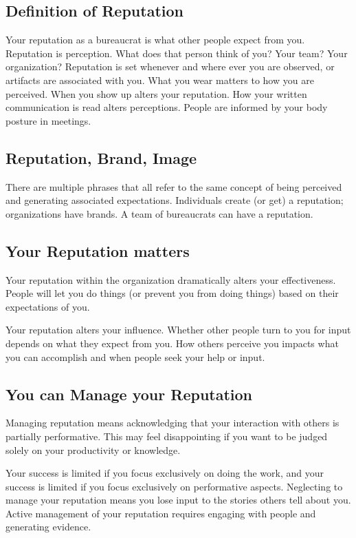 \subsection*{Definition of Reputation}

Your \gls{reputation} as a bureaucrat is what other people expect from you. \iftoggle{glossaryinmargin}{\marginpar{[Glossary]}}{}%
%
Reputation is perception. What does that person think of you? Your team? Your organization? 
Reputation is set whenever and where ever you are observed, or artifacts are associated with you. 
What you wear matters to how you are perceived. When you show up alters your reputation. How your written communication is read alters perceptions. People are informed by your body posture in meetings. 

\subsection*{Reputation, Brand, Image}

There are multiple phrases that all refer to the same concept of being perceived and generating associated expectations. Individuals create (or get) a reputation; organizations have brands. A team of bureaucrats can have a reputation. 

\subsection*{Your Reputation matters}

Your reputation within the organization dramatically alters your effectiveness. People will let you do things (or prevent you from doing things) based on their expectations of you. 

Your reputation alters your influence. Whether other people turn to you for input depends on what they expect from you. How others perceive you impacts what you can accomplish and when people seek your help or input.

\subsection*{You can Manage your Reputation}

Managing reputation means acknowledging that your interaction with others is partially performative. This may feel disappointing if you want to be judged solely on your productivity or knowledge. 

Your success is limited if you focus exclusively on doing the work, and your success is limited if you focus exclusively on performative aspects. 
Neglecting to manage your reputation means you lose input to the stories others tell about you. Active management of your reputation requires engaging with people and generating evidence. 

